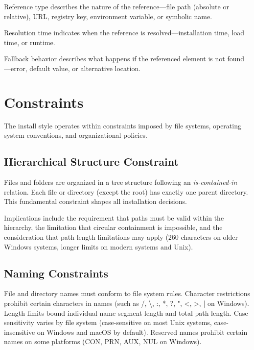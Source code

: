 \documentclass[11pt]{article}
\begin{document}
Reference type describes the nature of the reference---file path (absolute or relative), URL, registry key, environment variable, or symbolic name.

Resolution time indicates when the reference is resolved---installation time, load time, or runtime.

Fallback behavior describes what happens if the referenced element is not found---error, default value, or alternative location.

\section{Constraints}

The install style operates within constraints imposed by file systems, operating system conventions, and organizational policies.

\subsection{Hierarchical Structure Constraint}

Files and folders are organized in a tree structure following an \textit{is-contained-in} relation. Each file or directory (except the root) has exactly one parent directory. This fundamental constraint shapes all installation decisions.

Implications include the requirement that paths must be valid within the hierarchy, the limitation that circular containment is impossible, and the consideration that path length limitations may apply (260 characters on older Windows systems, longer limits on modern systems and Unix).

\subsection{Naming Constraints}

File and directory names must conform to file system rules. Character restrictions prohibit certain characters in names (such as /, \textbackslash, :, *, ?, ", <, >, | on Windows). Length limits bound individual name segment length and total path length. Case sensitivity varies by file system (case-sensitive on most Unix systems, case-insensitive on Windows and macOS by default). Reserved names prohibit certain names on some platforms (CON, PRN, AUX, NUL on Windows).
\end{document}
